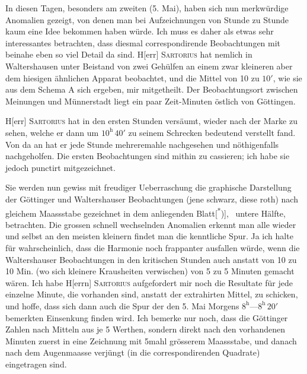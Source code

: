 In diesen Tagen, besonders am zweiten (5. Mai), haben sich nun merkwürdige
Anomalien gezeigt, von denen man bei Aufzeichnungen von Stunde
zu Stunde kaum eine Idee bekommen haben würde. Ich muss es daher als
etwas sehr interessantes betrachten, dass diesmal correspondirende Beobachtungen
mit beinahe eben so viel Detail da sind. H[err] \textsc{Sartorius} hat nemlich
in Waltershausen unter Beistand von zwei Gehülfen an einem zwar kleineren
\clearpage{}
\noindent aber dem hiesigen ähnlichen Apparat beobachtet, und die Mittel von 10 zu
\(10'\), wie sie aus dem Schema A sich ergeben, mir mitgetheilt. Der Beobachtungsort
zwischen Meinungen und Münnerstadt liegt ein paar Zeit-Minuten
östlich von Göttingen.

H[err] \textsc{Sartorius} hat in den ersten Stunden versäumt, wieder nach der
Marke zu sehen, welche er dann um \(10^{\mathrm{h}}\,40'\) zu seinem Schrecken bedeutend
verstellt fand. Von da an hat er jede Stunde mehreremahle nachgesehen und
nöthigenfalls nachgeholfen. Die ersten Beobachtungen sind mithin zu cassieren;
ich habe sie jedoch punctirt mitgezeichnet.

Sie werden nun gewiss mit freudiger Ueberraschung die graphische Darstellung
der Göttinger und Waltershauser Beobachtungen (jene schwarz, diese
roth) nach gleichem Maassstabe gezeichnet in dem anliegenden Blatt[\textsuperscript{*})],\begingroup\renewcommand{\thefootnote}{}
\endgroup\ untere
Hälfte, betrachten. Die grossen schnell wechselnden Anomalien erkennt man
alle wieder und selbst an den meisten kleinern findet man die kenntliche Spur.
Ja ich halte für wahrscheinlich, dass die Harmonie noch frappanter ausfallen
würde, wenn die Waltershauser Beobachtungen in den kritischen Stunden
auch anstatt von 10 zu 10 Min. (wo sich kleinere Krausheiten verwischen)
von 5 zu 5 Minuten gemacht wären. Ich habe H[errn] \textsc{Sartorius} aufgefordert
mir noch die Resultate für jede einzelne Minute, die vorhanden sind, anstatt
der extrahirten Mittel, zu schicken, und hoffe, dass sich dann auch die Spur
der  den 5. Mai Morgens \(8^{\mathrm{h}}\text{—}8^{\mathrm{h}}\,20'\)
bemerkten Einsenkung finden wird. Ich bemerke nur noch, dass die Göttinger
Zahlen  nach Mitteln aus je 5 Werthen, sondern direkt nach den 
vorhandenen Minuten zuerst in eine Zeichnung mit 5mahl grösserem
Maassstabe, und danach nach dem Augenmaasse verjüngt (in die correspondirenden
Quadrate) eingetragen sind.

